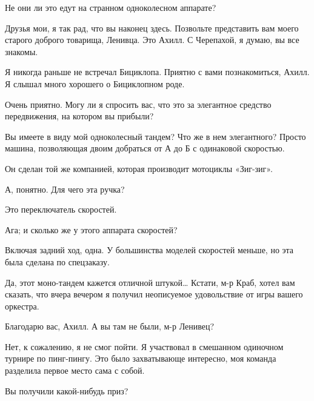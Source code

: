 \documentclass[../main.tex]{subfiles}
\begin{document}


\begin{dialogue}

 Не они ли это едут на странном одноколесном аппарате?


 Друзья мои, я так рад, что вы наконец здесь. Позвольте представить вам моего старого доброго товарища, Ленивца. Это Ахилл. С Черепахой, я думаю, вы все знакомы.

 Я никогда раньше не встречал Бициклопа. Приятно с вами познакомиться, Ахилл. Я слышал много хорошего о Бициклопном роде.

 Очень приятно. Могу ли я спросить вас, что это за элегантное средство передвижения, на котором вы прибыли?

 Вы имеете в виду мой одноколесный тандем? Что же в нем элегантного? Просто машина, позволяющая двоим добраться от А до Б с одинаковой скоростью.

 Он сделан той же компанией, которая производит мотоциклы «Зиг-зиг».

 А, понятно. Для чего эта ручка?

 Это переключатель скоростей.

 Ага; и сколько же у этого аппарата скоростей?

 Включая задний ход, одна. У большинства моделей скоростей меньше, но эта была сделана по спецзаказу.

 Да, этот моно-тандем кажется отличной штукой\ldots{} Кстати, м-р Краб, хотел вам сказать, что вчера вечером я получил неописуемое удовольствие от игры вашего оркестра.

 Благодарю вас, Ахилл. А вы там не были, м-р Ленивец?

 Нет, к сожалению, я не смог пойти. Я участвовал в смешанном одиночном турнире по пинг-пингу. Это было захватывающе интересно, моя команда разделила первое место сама с собой.

 Вы получили какой-нибудь приз?


\end{dialogue}
\end{document}

